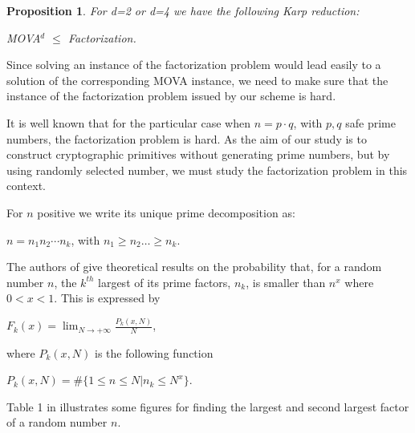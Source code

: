 \documentclass[11pt, a4paper, twoside, openright]{report}
\newtheorem{proposition}{Proposition}
\begin{document}
		\begin{proposition}
	 		For d=2 or d=4 we have the following Karp reduction:
	 			
	 		\hspace{30mm} 	MOVA$^d$ $\leq$ Factorization.	
 		\end{proposition}
 		
 		Since solving an instance of the factorization problem  would lead easily to a solution of the
 	 		corresponding MOVA instance, we need to make sure that the instance of the factorization problem issued 
 	 		by our scheme is hard. 
 	 		
 		

 			It is well known that for the particular case when $n = p \cdot q$, with $p,q$ safe prime numbers, the factorization 
 	 		problem is hard. As the aim of our study is to construct cryptographic primitives without generating prime numbers, but by using randomly selected number, we must study the factorization  problem in this context. 
 	 		
 	 		For $n$ positive we write its unique prime decomposition as: 
 	 		 		
 	 		 	\hspace{30mm} $n = n_1 n_2 \cdots n_k$, with $n_1 \geq n_2 \ldots \geq n_k$.  
 	 		 		
 	 		 	\bigskip
 		
 			The authors of \cite{fact} give theoretical results on the probability that, for a random number
 			$n$, the $k^{th}$ largest of its prime factors, $n_k$, is smaller than $n^x$ where $0 < x < 1$. This is expressed by 
 		

		\hspace{30 mm}  $F_k(x) = \lim_{N \to +\infty} \frac{P_k(x,N)}{N}$, 

		\noindent where $P_k(x,N)$ is the following function

		\hspace{30mm} $P_k(x,N)= \# \{ 1 \leq n \leq N | n_k \leq N^x\}$. 

 
        Table 1  in \cite{thesis}  illustrates some figures for finding the largest and second largest factor of a  		random number $n$.            
                                               
\end{document}

